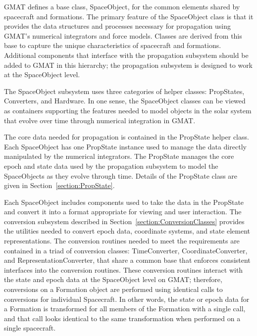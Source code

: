 GMAT defines a base class, SpaceObject, for the common elements shared by spacecraft and
formations.  The primary feature of the SpaceObject class is that it provides the data structures
and processes necessary for propagation using GMAT's numerical integrators and force models.
Classes are derived from this base to capture the unique characteristics of spacecraft and
formations.  Additional components that interface with the propagation subsystem should be added to
GMAT in this hierarchy; the propagation subsystem is designed to work at the SpaceObject level.

The SpaceObject subsystem uses three categories of helper classes: PropStates, Converters, and
Hardware.  In one sense, the SpaceObject classes can be viewed as containers supporting the
features needed to model objects in the solar system that evolve over time through numerical
integration in GMAT.

The core data needed for propagation is contained in the PropState helper class.  Each SpaceObject
has one PropState instance used to manage the data directly manipulated by the numerical
integrators.  The PropState manages the core epoch and state data used by the propagation subsystem
to model the SpaceObjects as they evolve through time.  Details of the PropState class are given in
Section~\ref{section:PropState}.

Each SpaceObject includes components used to take the data in the PropState and convert it into a
format appropriate for viewing and user interaction. The conversion subsystem described in
Section~\ref{section:ConversionClasses} provides the utilities needed to convert epoch data,
coordinate systems, and state element representations.  The conversion routines needed to meet the
requirements are contained in a triad of conversion classes: TimeConverter, CoordinateConverter, and
RepresentationConverter, that share a common base that enforces consistent interfaces into the
conversion routines.  These conversion routines interact with the state and epoch data at the
SpaceObject level on GMAT; therefore, conversions on a Formation object are performed using
identical calls to conversions for individual Spacecraft.  In other words, the state or epoch data
for a Formation is transformed for all members of the Formation with a single call, and that call
looks identical to the same transformation when performed on a single spacecraft.


